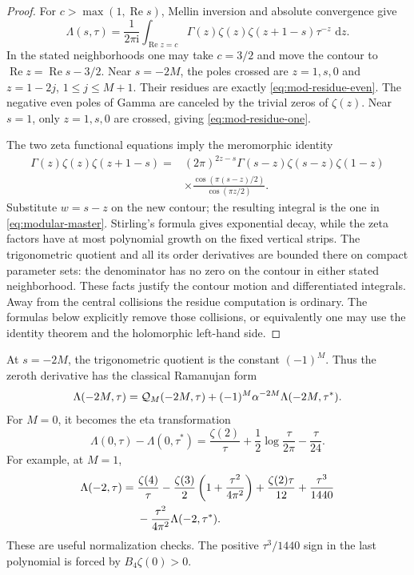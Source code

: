 \documentclass[11pt,letterpaper]{article}
\numberwithin{equation}{section}
\theoremstyle{definition}
\theoremstyle{remark}
\DeclareMathOperator{\Ree}{Re}
\newcommand{\ii}{\mathrm i}
\newcommand{\dd}{\,\mathrm d}
\begin{document}
\begin{proof}
For \(c>\max(1,\Ree s)\), Mellin inversion and absolute convergence
give
\begin{equation}\label{eq:lambert-mellin}
 \Lambda(s,\tau)=\frac1{2\pi\ii}
       \int_{\Ree z=c}\Gamma(z)\zeta(z)\zeta(z+1-s)
                                  \tau^{-z}\,\dd z.
\end{equation}
In the stated neighborhoods one may take \(c=3/2\) and move the
contour to \(\Ree z=\Ree s-3/2\).
Near \(s=-2M\), the poles crossed are \(z=1,s,0\) and
\(z=1-2j\), \(1\leq j\leq M+1\). Their residues are exactly
\eqref{eq:mod-residue-even}. The negative even poles of Gamma
are canceled by the trivial zeros of \(\zeta(z)\).
Near \(s=1\), only \(z=1,s,0\) are crossed, giving
\eqref{eq:mod-residue-one}.

The two zeta functional equations \cite[Section 25.4]{DLMF} imply
the meromorphic identity
\begin{equation}\label{eq:mod-functional-factor}
 \begin{split}
 \Gamma(z)\zeta(z)\zeta(z+1-s)
  ={}&(2\pi)^{2z-s}\Gamma(s-z)\zeta(s-z)\zeta(1-z)\\
 &\times
 \frac{\cos(\pi(s-z)/2)}{\cos(\pi z/2)}.
 \end{split}
\end{equation}
Substitute \(w=s-z\) on the new contour; the resulting integral
is the one in \eqref{eq:modular-master}.
Stirling's formula gives exponential decay, while the zeta
factors have at most polynomial growth on the fixed vertical
strips. The trigonometric quotient and all its order derivatives
are bounded there on compact parameter sets: the denominator has
no zero on the contour in either stated neighborhood. These facts
justify the contour motion and differentiated integrals.
Away from the central collisions the residue computation is
ordinary. The formulas below explicitly remove those collisions,
or equivalently one may use the identity theorem and the
holomorphic left-hand side.
\end{proof}

At \(s=-2M\), the trigonometric quotient is the constant
\((-1)^M\). Thus the zeroth derivative has the classical
Ramanujan form
\begin{equation}\label{eq:ramanujan-recovered}
 \Lambda(-2M,\tau)=
 {\cal Q}_M(-2M,\tau)+(-1)^M\alpha^{-2M}
                         \Lambda(-2M,\tau^*).
\end{equation}
For \(M=0\), it becomes the eta transformation
\begin{equation}\label{eq:eta-recovered}
 \Lambda(0,\tau)-\Lambda(0,\tau^*)
   =\frac{\zeta(2)}{\tau}
     +\frac12\log\frac{\tau}{2\pi}-\frac{\tau}{24}.
\end{equation}
For example, at \(M=1\),
\begin{align}
 \Lambda(-2,\tau)
 ={}&\frac{\zeta(4)}{\tau}
   -\frac{\zeta(3)}2\left(1+\frac{\tau^2}{4\pi^2}\right)
   +\frac{\zeta(2)\tau}{12}+\frac{\tau^3}{1440}\notag\\
 &-\frac{\tau^2}{4\pi^2}\Lambda(-2,\tau^*).
 \label{eq:zeta3-recovered}
\end{align}
These are useful normalization checks. The positive
\(\tau^3/1440\) sign in the last polynomial is forced by
\(B_4\zeta(0)>0\).
\end{document}
